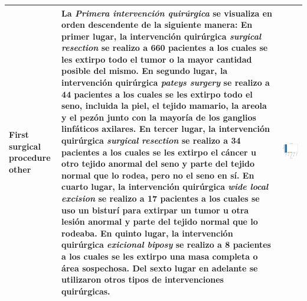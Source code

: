 \begin{table}[!htb]
	\footnotesize
	\begin{threeparttable}
		\begin{tabular}{p{2.5cm} p{7cm} p{6.5cm}} \toprule
			First surgical procedure other
			& La \textit{Primera intervención quirúrgica} se visualiza en orden descendente de la siguiente manera: En primer lugar, la intervención quirúrgica \textit{surgical resection} se realizo a 660 pacientes a los cuales se les extirpo todo el tumor o la mayor cantidad posible del mismo. 	En segundo lugar, la intervención quirúrgica \textit{pateys surgery} se realizo a 44 pacientes a los cuales se les extirpo todo el seno, incluida la piel, el tejido mamario, la areola y el pezón junto con la mayoría de los ganglios linfáticos axilares. En tercer lugar, la intervención quirúrgica \textit{surgical resection} se realizo a 34 pacientes a los cuales se les extirpo el cáncer u otro tejido anormal del seno y parte del tejido normal que lo rodea, pero no el seno en sí. En cuarto lugar, la intervención quirúrgica \textit{wide local excision} se realizo a 17 pacientes a los cuales se uso un bisturí para extirpar un tumor u otra lesión anormal y parte del tejido normal que lo rodeaba. En quinto lugar, la intervención quirúrgica \textit{exicional biposy} se realizo a 8 pacientes a los cuales se les extirpo una masa completa o área sospechosa. Del sexto lugar en adelante se utilizaron otros tipos de intervenciones quirúrgicas.
			
			& \begin{center}\includegraphics[width=1\linewidth]{NOTEBOOK/IMAGENES_DESCRIPTIVAS/16_surgical_other}\end{center}
			\\ \hline
			

\end{tabular}
\end{threeparttable}
\end{table}
